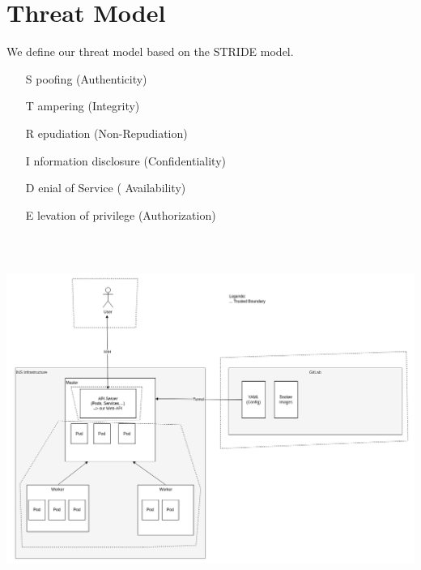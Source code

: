 \chapter{Threat Model}

We define our threat model based on the STRIDE model.
\begin{itemize}
    \item [S]poofing (Authenticity)
    \item [T]ampering (Integrity)
    \item [R]epudiation (Non-Repudiation)
    \item [I]nformation disclosure (Confidentiality)
    \item [D]enial of Service ( Availability)
    \item [E]levation of privilege (Authorization)
\end{itemize}

\includegraphics[height=12cm]{resources/architecture_threat_model.png}

